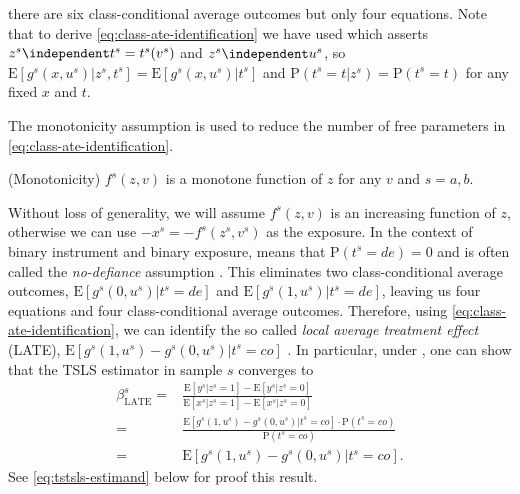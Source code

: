 \documentclass[preprint]{imsart}
\begin{document}
there are six class-conditional average outcomes but only four
equations. Note that to derive \eqref{eq:class-ate-identification} we have
used  which asserts $z^s \independent t^s = t^s(v^s)$ and
$z^s \independent u^s$, so $\mathrm{E}[g^s(x,u^s)|z^s,t^s] =
\mathrm{E}[g^s(x,u^s)|t^s]$ and $\mathrm{P}(t^s = t|z^s) =
\mathrm{P}(t^s = t)$ for any fixed $x$ and $t$.

The monotonicity assumption is used to reduce the number of free
parameters in \eqref{eq:class-ate-identification}.
\begin{assumption} \label{assump:monotonicity}
  (Monotonicity) $f^s(z,v)$ is a monotone function of $z$ for any $v$ and $s =
  a,b$.
\end{assumption}
Without loss of generality, we will assume $f^s(z,v)$ is an increasing
function of $z$, otherwise we can use $-x^s = -f^s(z^s,v^s)$ as the
exposure. In the context of binary instrument and binary exposure,
 means that $\mathrm{P}(t^s = de) = 0$ and is
often called the \emph{no-defiance} assumption
\citep{balke1997bounds}. This eliminates two class-conditional average
outcomes, $\mathrm{E}[g^s(0,u^s)|t^s=de]$ and
$\mathrm{E}[g^s(1,u^s)|t^s=de]$, leaving us four equations and four
class-conditional average outcomes. Therefore, using
\eqref{eq:class-ate-identification}, we can identify the so called
\emph{local average treatment effect} (LATE),
$\mathrm{E}[g^s(1,u^s)-g^s(0,u^s)|t^s=co]$
\citep{angrist1996identification}. In particular, under
, one can show
that the TSLS estimator in sample $s$ converges to
\begin{equation} \label{eq:tsls-estimand}
  \begin{split}
    \beta_{\mathrm{LATE}}^s=&\frac{\mathrm{E}[y^s|z^s=1] - \mathrm{E}[y^s|z^s =
      0]}{\mathrm{E}[x^s|z^s=1] - \mathrm{E}[x^s|z^s = 0]} \\
    =&
    \frac{\mathrm{E}[g^s(1,u^s)-g^s(0,u^s)|t^s=co] \cdot \mathrm{P}(t^s =
      co)}{\mathrm{P}(t^s = co)} \\
    =&
    \mathrm{E}[g^s(1,u^s)-g^s(0,u^s)|t^s=co].
  \end{split}
\end{equation}
See \eqref{eq:tstsls-estimand} below for proof this result.
\end{document}
